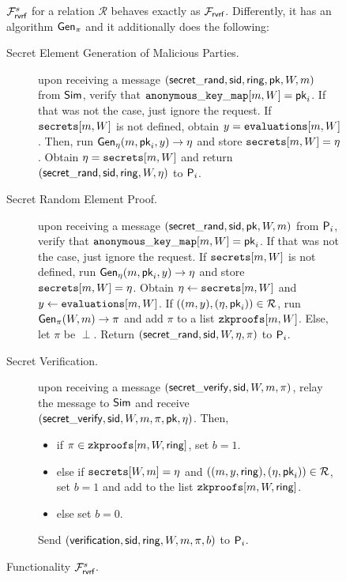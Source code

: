 \begin{figure}
	\begin{tcolorbox}
		{
			$ \mathcal{F}_{\textsf{rvrf}}^s$ for a relation $ \mathcal{R} $ behaves exactly as $ \mathcal{F}_{\textsf{rvrf}} $. Differently, it has an algorithm $ \mathsf{Gen}_{\pi} $ and  it additionally does the following:
			\begin{description}
				\item [Secret Element Generation of Malicious Parties.]upon receiving a message $(\mathsf{secret\_rand}, \textsf{sid}, \mathsf{ring},\mathsf{pk},W, m)$ from $\mathsf{Sim}$, verify that $ \mathtt{anonymous\_key\_map}[m,W] =  \mathsf{pk}_i $. If that was not the case, just ignore the request. If $ \texttt{secrets}[m,W] $ is not defined, obtain $ y = \texttt{evaluations}[m, W] $. Then, run $ \mathsf{Gen}_{\eta}(m,\mathsf{pk}_i, y) \rightarrow \eta  $ and store $ \texttt{secrets}[m,W] = \eta $. Obtain $ \eta = \texttt{secrets}[m,W] $  and return $(\mathsf{secret\_rand}, \textsf{sid}, \mathsf{ring}, W, \eta)$ to $ \mathsf{P}_i $.
				
				\item[Secret Random Element Proof.] upon receiving a message $(\mathsf{secret\_rand}, \textsf{sid}, \mathsf{pk}, W, m)$ from $\mathsf{P}_i$, verify that $ \mathtt{anonymous\_key\_map}[m,W] =  \mathsf{pk}_i $. If that was not the case, just ignore the request. If $ \texttt{secrets}[m,W] $ is not defined, run  $ \mathsf{Gen}_{\eta}(m,\mathsf{pk}_i, y) \rightarrow \eta  $ and store $ \texttt{secrets}[m,W] = \eta $. Obtain $ \eta \leftarrow\texttt{secrets}[m,W] $ and $ y \leftarrow \texttt{evaluations}[m,W] $. If $ ((m, y),(\eta,\mathsf{pk}_i)) \in \mathcal{R} $,  run  $ \mathsf{Gen}_\pi(W, m) \rightarrow \pi $ and add $ \pi $ to a list $ \texttt{zkproofs}[m, W] $. Else, let $ \pi  $ be $ \perp $. Return $(\mathsf{secret\_rand}, \textsf{sid}, W, \eta, \pi)$ to $ \mathsf{P}_i $.
				
				\item[Secret Verification.] upon receiving a message $(\mathsf{secret\_verify}, \textsf{sid}, W, m, \pi)$, relay the message to $ \mathsf{Sim} $ and receive $(\mathsf{secret\_verify}, \textsf{sid}, W, m, \pi, \mathsf{pk},\eta)$. Then,
				
				\begin{itemize}
					\item if $ \pi \in \texttt{zkproofs}[m,W,\mathsf{ring}] $, set $ b = 1 $.
					\item else if $ \texttt{secrets}[W,m] = \eta$ and $ ((m, y, \mathsf{ring}),(\eta,\mathsf{pk}_i)) \in \mathcal{R} $, set $ b = 1 $ and add to the list $ \texttt{zkproofs}[m,W,\mathsf{ring}] $.
					\item else set $ b = 0 $.
				\end{itemize}
				Send $(\mathsf{verification}, \textsf{sid}, \mathsf{ring}, W, m, \pi, b)$ to $ \mathsf{P}_i $.
			\end{description}
		}
	\end{tcolorbox}
	\caption{Functionality  $ \mathcal{F}_{\textsf{rvrf}}^s $.\label{f:gvrfzk}}
\end{figure}
